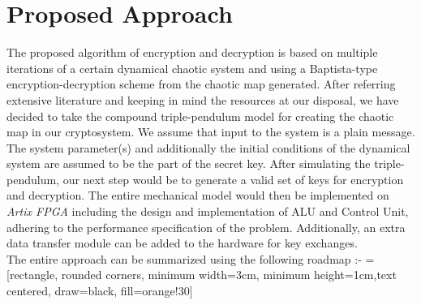 \chapter{Proposed Approach}
\label{chap:system}
\setlength{\parskip}{1.5mm}
The proposed algorithm of encryption and decryption is based on multiple iterations of a certain dynamical chaotic system and using a Baptista-type encryption-decryption scheme from the chaotic map generated. After referring extensive literature and keeping in mind the resources at our disposal, we have decided to take the compound triple-pendulum model for creating the chaotic map in our cryptosystem. We assume that input to the system is a plain message. The system parameter(s) and additionally the initial conditions of the dynamical system are assumed to be the part of the secret key. After simulating the triple-pendulum, our next step would be to generate a valid set of keys for encryption and decryption. The entire mechanical model would then be implemented on {\em Artix FPGA} including the design and implementation of ALU and Control Unit, adhering to the performance specification of the problem. Additionally, an extra data transfer module can be added to the hardware for key exchanges.\\
The entire approach can be summarized using the following roadmap :- 
\vfill
{} = [rectangle, rounded corners, minimum width=3cm, minimum height=1cm,text centered, draw=black, fill=orange!30]
\hspace{1.0cm}
\vfill
